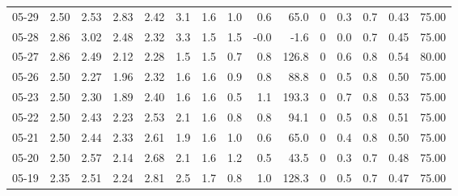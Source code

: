 \begin{threeparttable}
{\begin{tabular}{lrrrrrrrrrrrrrr}
  05-29 &          2.50 &          2.53 &          2.83 &        2.42 &                 3.1 &                1.6 &                 1.0 &        0.6 &         65.0 &              0 &                 0.3 &              0.7 &            0.43 &                  75.00 \\
  05-28 &          2.86 &          3.02 &          2.48 &        2.32 &                 3.3 &                1.5 &                 1.5 &       -0.0 &         -1.6 &              0 &                 0.0 &              0.7 &            0.45 &                  75.00 \\
  05-27 &          2.86 &          2.49 &          2.12 &        2.28 &                 1.5 &                1.5 &                 0.7 &        0.8 &        126.8 &              0 &                 0.6 &              0.8 &            0.54 &                  80.00 \\
  05-26 &          2.50 &          2.27 &          1.96 &        2.32 &                 1.6 &                1.6 &                 0.9 &        0.8 &         88.8 &              0 &                 0.5 &              0.8 &            0.50 &                  75.00 \\
  05-23 &          2.50 &          2.30 &          1.89 &        2.40 &                 1.6 &                1.6 &                 0.5 &        1.1 &        193.3 &              0 &                 0.7 &              0.8 &            0.53 &                  75.00 \\
  05-22 &          2.50 &          2.43 &          2.23 &        2.53 &                 2.1 &                1.6 &                 0.8 &        0.8 &         94.1 &              0 &                 0.5 &              0.8 &            0.51 &                  75.00 \\
  05-21 &          2.50 &          2.44 &          2.33 &        2.61 &                 1.9 &                1.6 &                 1.0 &        0.6 &         65.0 &              0 &                 0.4 &              0.8 &            0.50 &                  75.00 \\
  05-20 &          2.50 &          2.57 &          2.14 &        2.68 &                 2.1 &                1.6 &                 1.2 &        0.5 &         43.5 &              0 &                 0.3 &              0.7 &            0.48 &                  75.00 \\
  05-19 &          2.35 &          2.51 &          2.24 &        2.81 &                 2.5 &                1.7 &                 0.8 &        1.0 &        128.3 &              0 &                 0.5 &              0.7 &            0.47 &                  75.00 \\

\end{tabular}}
\end{threeparttable}
